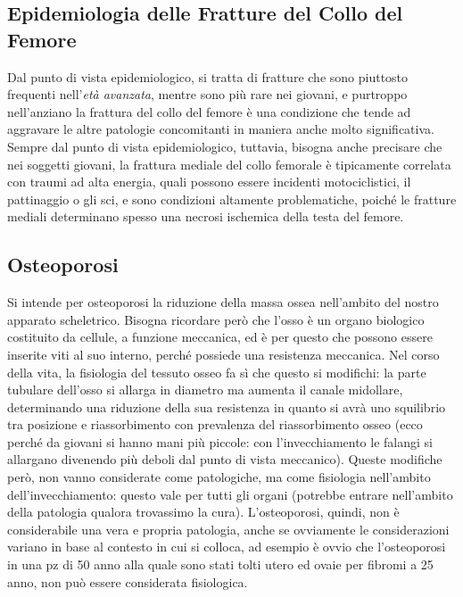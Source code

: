 \subsection{Epidemiologia delle Fratture del Collo del Femore}

Dal punto di vista epidemiologico, si tratta di fratture che sono
piuttosto frequenti nell'\emph{età avanzata}, mentre sono più rare nei
giovani, e purtroppo nell'anziano la frattura del collo del femore è una
condizione che tende ad aggravare le altre patologie concomitanti in
maniera anche molto significativa. Sempre dal punto di vista
epidemiologico, tuttavia, bisogna anche precisare che nei soggetti
giovani, la frattura mediale del collo femorale è tipicamente correlata
con traumi ad alta energia, quali possono essere incidenti
motociclistici, il pattinaggio o gli sci, e sono condizioni altamente
problematiche, poiché le fratture mediali determinano spesso una necrosi
ischemica della testa del femore.

\subsection{Osteoporosi}


Si intende per osteoporosi la riduzione della massa ossea nell'ambito
del nostro apparato scheletrico. Bisogna ricordare però che l'osso è un
organo biologico costituito da cellule, a funzione meccanica, ed è per
questo che possono essere inserite viti al suo interno, perché possiede
una resistenza meccanica. Nel corso della vita, la fisiologia del
tessuto osseo fa sì che questo si modifichi: la parte tubulare dell'osso
si allarga in diametro ma aumenta il canale midollare, determinando una
riduzione della sua resistenza in quanto si avrà uno squilibrio tra
posizione e riassorbimento con prevalenza del riassorbimento osseo (ecco
perché da giovani si hanno mani più piccole: con l'invecchiamento le
falangi si allargano divenendo più deboli dal punto di vista meccanico).
Queste modifiche però, non vanno considerate come patologiche, ma come
fisiologia nell'ambito dell'invecchiamento: questo vale per tutti gli
organi (potrebbe entrare nell'ambito della patologia qualora trovassimo
la cura). L'osteoporosi, quindi, non è considerabile una vera e propria
patologia, anche se ovviamente le considerazioni variano in base al
contesto in cui si colloca, ad esempio è ovvio che l'osteoporosi in una
pz di 50 anno alla quale sono stati tolti utero ed ovaie per fibromi a
25 anno, non può essere considerata fisiologica.

